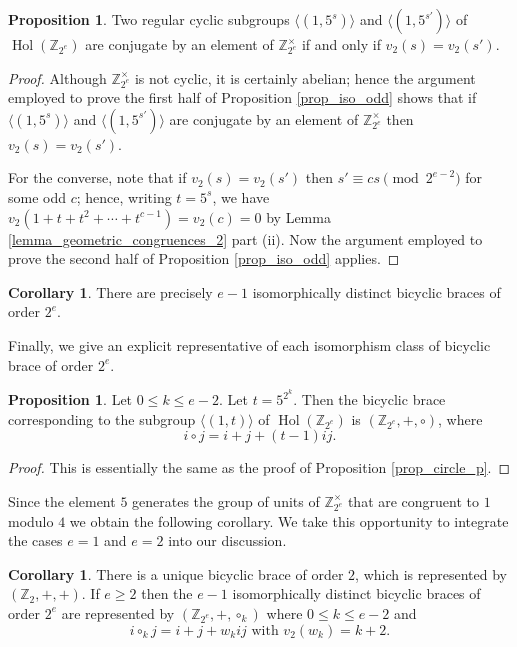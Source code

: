 \documentclass[reqno]{amsart}
\theoremstyle{definition}
\newtheorem{proposition}[theorem]{Proposition}
\newtheorem{corollary}[theorem]{Corollary}
\newcommand{\Z}{\mathbb{Z}}
\DeclareMathOperator{\Hol}{\mbox{Hol}}
\begin{document}
\begin{proposition}
Two regular cyclic subgroups $ \langle (1,5^{s}) \rangle $ and $ \langle (1,5^{s'}) \rangle $ of $ \Hol(\Z_{2^{e}}) $ are conjugate by an element of $ \Z_{2^{e}}^{\times} $ if and only if $ v_{2}(s) = v_{2}(s') $. 
\end{proposition}
\begin{proof}
Although $ \Z_{2^{e}}^{\times} $ is not cyclic, it is certainly abelian; hence the argument employed to prove the first half of  Proposition \ref{prop_iso_odd} shows that if $ \langle (1,5^{s}) \rangle $ and $ \langle (1,5^{s'}) \rangle $ are conjugate by an element of $ \Z_{2^{e}}^{\times} $ then $ v_{2}(s) = v_{2}(s') $. 

For the converse, note that if $ v_{2}(s) = v_{2}(s') $ then $ s' \equiv cs \pmod{2^{e-2}} $ for some odd $ c $; hence, writing $ t=5^{s} $, we have $ v_{2}(1+t+t^{2}+ \cdots +t^{c-1}) = v_{2}(c)= 0 $ by Lemma \ref{lemma_geometric_congruences_2} part (ii). Now the argument employed to prove the second half of Proposition \ref{prop_iso_odd} applies. 
\end{proof}

\begin{corollary}
There are precisely $ e-1 $ isomorphically distinct bicyclic braces of order $ 2^{e} $. 
\end{corollary}

Finally, we give an explicit representative of each isomorphism class of bicyclic brace of order $ 2^{e} $. 

\begin{proposition} \label{prop_circle_2}
Let $ 0 \leq k \leq e-2 $. Let $ t = 5^{2^{k}} $. Then the bicyclic brace corresponding to the subgroup $ \langle (1,t) \rangle $ of $ \Hol(\Z_{2^{e}}) $ is $ (\Z_{2^{e}},+,\circ) $, where
\[ i \circ j = i+j+(t-1)ij. \]
\end{proposition}
\begin{proof}
This is essentially the same as the proof of Proposition \ref{prop_circle_p}.
\end{proof}

Since the element $ 5 $ generates the group of units of $ \Z_{2^{e}}^{\times} $ that are congruent to $ 1 $ modulo $ 4 $ we obtain the following corollary. We take this opportunity to integrate the cases $ e=1 $ and $ e=2 $ into our discussion. 

\begin{corollary} \label{cor_circle_2}
There is a unique bicyclic brace of order $ 2 $, which is represented by $ (\Z_{2},+,+) $. If $ e \geq 2 $ then the $ e-1 $ isomorphically distinct bicyclic braces of order $ 2^{e} $ are represented by $ (\Z_{2^{e}},+,\circ_{k}) $ where $ 0 \leq k \leq e-2 $ and 
\[ i \circ_{k} j = i + j + w_{k}ij \mbox{ with } v_{2}(w_{k}) = k+2. \]
\end{corollary}
\end{document}
